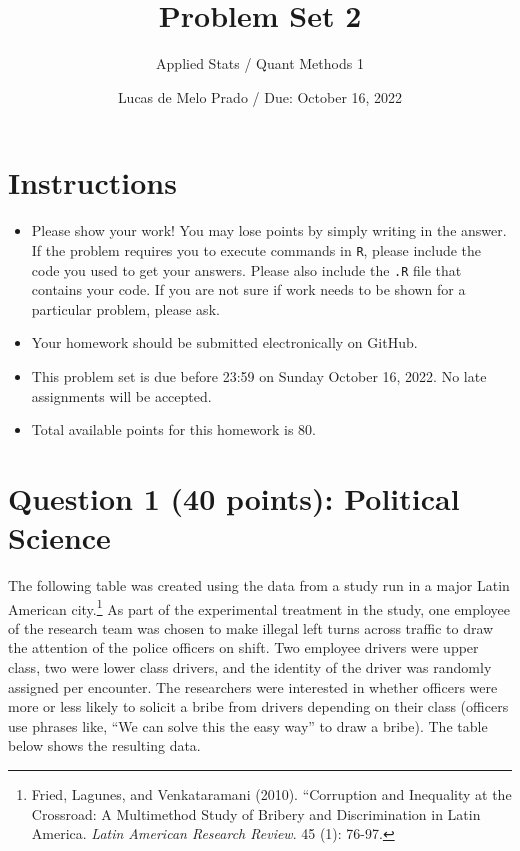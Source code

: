 \documentclass[12pt,letterpaper]{article}
\title{Problem Set 2}
\author{Applied Stats / Quant Methods 1}
\date{Lucas de Melo Prado / Due: October 16, 2022}
\begin{document}
	
	\maketitle
	
\section*{Instructions}
	
	\begin{itemize}
	
		\item Please show your work! You may lose points by simply writing in the answer. If the problem requires you to execute commands in \texttt{R}, please include the code you used to get your answers. Please also include the \texttt{.R} file that contains your code. If you are not sure if work needs to be shown for a particular problem, please ask.
	
		\item Your homework should be submitted electronically on GitHub.
	
		\item This problem set is due before 23:59 on Sunday October 16, 2022. No late assignments will be accepted.
	
		\item Total available points for this homework is 80.
	
	\end{itemize}
	
	\vspace{.5cm}

\section*{Question 1 (40 points): Political Science}
	
	\vspace{.25cm}
		
	The following table was created using the data from a study run in a major Latin American city.\footnote{Fried, Lagunes, and Venkataramani (2010). ``Corruption and Inequality at the Crossroad: A Multimethod Study of Bribery and Discrimination in Latin America. \textit{Latin American Research Review}. 45 (1): 76-97.} As part of the experimental treatment in the study, one employee of the research team was chosen to make illegal left turns across traffic to draw the attention of the police officers on shift. Two employee drivers were upper class, two were lower class drivers, and the identity of the driver was randomly assigned per encounter. The researchers were interested in whether officers were more or less likely to solicit a bribe from drivers depending on their class (officers use phrases like, ``We can solve this the easy way'' to draw a bribe). The table below shows the resulting data.
\end{document}
